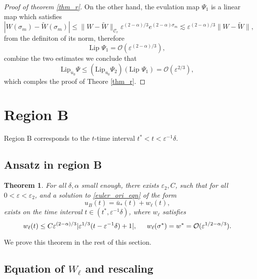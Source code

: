 \documentclass[letterpaper,11pt]{article}
\newcommand{\rmO}{\mathcal{O}}
\newcommand{\eps}{\varepsilon}
\newcommand{\lar}{ \lesssim }
\numberwithin{equation}{section}
\theoremstyle{plain}
\newtheorem{theorem}{Theorem}[section]
\begin{document}
\begin{proof}[Proof of theorem \ref{thm_r}]
On the other hand, the evulation map $\Psi_1$ is a linear map which satisfies
\[
|W(\sigma_m) -\widetilde{W}(\sigma_m) | \le\|W - \widetilde{W}\|_{\mathcal{C}_r}\eps^{(2-\alpha)/3} e^{(2-\alpha)\sigma_m} \lar \eps^{(2-\alpha)/3}\|W-\widetilde{W}\|,
\]
 from the definiton of its norm, therefore
\[
\text{Lip } \Psi_1 = \rmO(\eps^{(2-\alpha)/3}),
\]
combine the two estimates we conclude that 
\[
\text{Lip}_{u_0} \Psi \le \left( \text{Lip}_{u_0} \Psi_2 \right) \left( \text{Lip } \Psi_1 \right) = \rmO(\eps^{2/3}),
\] 
which comples the proof of Theore \ref{thm_r}.
\end{proof}

\section{Region B}\label{sec_B}

Region B corresponds to the $t$-time interval $ t^*< t< \eps^{-1}\delta$.

\subsection{Ansatz in region B}

\begin{theorem}\label{thm_l}
For all $\delta, \alpha$ small enough, there exists $\eps_2,C$, such that for all $0<\eps <\eps_2$, and a solution to \eqref{euler_ori_eqn} of the form
\[
u_B(t ) = \bar{u}_*(t) + w_\ell(t),
\]
exists on the time interval $t \in (t^*, \eps^{-1}\delta)$, where $w_\ell$ satisfies
\begin{equation}\label{thm_l_1}
w_\ell(t) \le C\eps^{(2-\alpha)/3} | \eps^{1/3}(t-\eps^{-1}\delta)+1|, \hspace{0.2in} w_\ell(\sigma^*) =  w^* = \rmO(\eps^{1/2-\alpha/3}).
\end{equation}
 
\end{theorem}

We prove this theorem in the rest of this section.
\subsection{Equation of \texorpdfstring{$W_{\ell}$}{Well} and rescaling}
\end{document}
